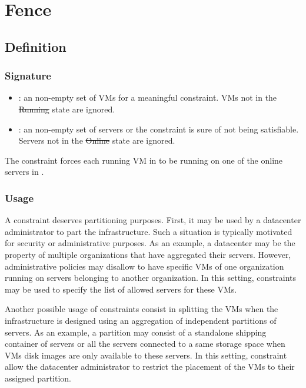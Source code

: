 \section{Fence}
\subsection{Definition}

\subsubsection{Signature} 

\begin{itemize}
\item {} : an non-empty set of VMs for a meaningful constraint. VMs not in the \st{Running} state are ignored.
\item {} : an non-empty set of servers or the constraint is sure of not being satisfiable.
Servers not in the \st{Online} state are ignored.
\end{itemize}

The  constraint forces each running VM in  to be running on one of
the online servers in . 


\subsubsection{Usage}

A  constraint deserves partitioning purposes. First, it may be used by a datacenter administrator to part the infrastructure. Such a situation is typically motivated for security or administrative purposes. As an example, a datacenter may be the property of multiple organizations that have aggregated their servers. However, administrative policies may disallow to have specific VMs of one organization running on servers belonging to another organization. In this setting,  constraints may be used to specify the list of allowed servers for these VMs.

Another possible usage of  constraints consist in splitting the VMs when the infrastructure is designed using an aggregation of independent partitions of servers. As an example, a partition may consist of a standalone shipping container of servers or all the servers connected to a same storage space when VMs disk images are only available to these servers. In this setting,  constraint allow the datacenter administrator to restrict the placement of the VMs to their assigned partition.

